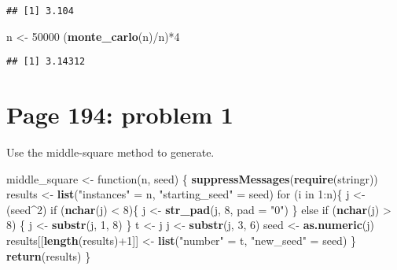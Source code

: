 \documentclass[]{article}
\newenvironment{Shaded}{\begin{snugshade}}{\end{snugshade}}
\newcommand{\KeywordTok}[1]{\textcolor[rgb]{0.13,0.29,0.53}{\textbf{{#1}}}}
\newcommand{\DataTypeTok}[1]{\textcolor[rgb]{0.13,0.29,0.53}{{#1}}}
\newcommand{\DecValTok}[1]{\textcolor[rgb]{0.00,0.00,0.81}{{#1}}}
\newcommand{\StringTok}[1]{\textcolor[rgb]{0.31,0.60,0.02}{{#1}}}
\newcommand{\NormalTok}[1]{{#1}}
\begin{document}
\begin{verbatim}
## [1] 3.104
\end{verbatim}

\begin{Shaded}
\begin{Highlighting}[]
\NormalTok{n <-}\StringTok{ }\DecValTok{50000}
\NormalTok{(}\KeywordTok{monte_carlo}\NormalTok{(n)/n)*}\DecValTok{4}
\end{Highlighting}
\end{Shaded}

\begin{verbatim}
## [1] 3.14312
\end{verbatim}

\newpage

\section{Page 194: problem 1}\label{page-194-problem-1}

Use the middle-square method to generate.

\begin{Shaded}
\begin{Highlighting}[]
\NormalTok{middle_square <-}\StringTok{ }\NormalTok{function(n, seed) \{}
          \KeywordTok{suppressMessages}\NormalTok{(}\KeywordTok{require}\NormalTok{(stringr))}
          \NormalTok{results <-}\StringTok{ }\KeywordTok{list}\NormalTok{(}\StringTok{"instances"} \NormalTok{=}\StringTok{ }\NormalTok{n, }\StringTok{"starting_seed"} \NormalTok{=}\StringTok{ }\NormalTok{seed)}
          \NormalTok{for (i in }\DecValTok{1}\NormalTok{:n)\{}
            \NormalTok{j <-}\StringTok{ }\NormalTok{(seed^}\DecValTok{2}\NormalTok{)}
              \NormalTok{if (}\KeywordTok{nchar}\NormalTok{(j) <}\StringTok{ }\DecValTok{8}\NormalTok{)\{}
                  \NormalTok{j <-}\StringTok{ }\KeywordTok{str_pad}\NormalTok{(j, }\DecValTok{8}\NormalTok{, }\DataTypeTok{pad =} \StringTok{"0"}\NormalTok{)}
              \NormalTok{\} else if (}\KeywordTok{nchar}\NormalTok{(j) >}\StringTok{ }\DecValTok{8}\NormalTok{) \{}
                \NormalTok{j <-}\StringTok{ }\KeywordTok{substr}\NormalTok{(j, }\DecValTok{1}\NormalTok{, }\DecValTok{8}\NormalTok{)}
              \NormalTok{\}}
            \NormalTok{t <-}\StringTok{ }\NormalTok{j }
            \NormalTok{j <-}\StringTok{ }\KeywordTok{substr}\NormalTok{(j, }\DecValTok{3}\NormalTok{, }\DecValTok{6}\NormalTok{)}
            \NormalTok{seed <-}\StringTok{ }\KeywordTok{as.numeric}\NormalTok{(j)}
            \NormalTok{results[[}\KeywordTok{length}\NormalTok{(results)+}\DecValTok{1}\NormalTok{]] <-}\StringTok{ }\KeywordTok{list}\NormalTok{(}\StringTok{"number"} \NormalTok{=}\StringTok{ }\NormalTok{t, }\StringTok{"new_seed"} \NormalTok{=}\StringTok{ }\NormalTok{seed)}
          \NormalTok{\}}
         \KeywordTok{return}\NormalTok{(results)}
\NormalTok{\}}
\end{Highlighting}
\end{Shaded}
\end{document}
